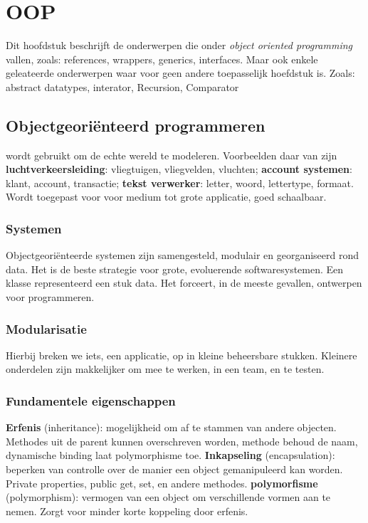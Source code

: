 \section{OOP}
Dit hoofdstuk beschrijft de onderwerpen die onder \textit{object oriented programming} vallen, zoals: references, wrappers, generics, interfaces.
Maar ook enkele geleateerde onderwerpen waar voor geen andere toepasselijk hoefdstuk is. Zoals: abstract datatypes, interator, Recursion, Comparator

\subsection{Objectgeoriënteerd programmeren}
 wordt gebruikt om de echte wereld te modeleren.
Voorbeelden daar van zijn \textbf{luchtverkeersleiding}: vliegtuigen, vliegvelden, vluchten; \textbf{account systemen}: klant, account, transactie; \textbf{tekst verwerker}: letter, woord, lettertype, formaat.
Wordt toegepast voor voor medium tot grote applicatie, goed schaalbaar.

\subsubsection{Systemen}
Objectgeoriënteerde systemen zijn samengesteld, modulair en georganiseerd rond data.
Het is de beste strategie voor grote, evoluerende softwaresystemen.
Een klasse representeerd een stuk data.
Het forceert, in de meeste gevallen, ontwerpen voor programmeren.

\subsubsection{Modularisatie}
Hierbij breken we iets, een applicatie, op in kleine beheersbare stukken.
Kleinere onderdelen zijn makkelijker om mee te werken, in een team, en te testen.

\subsubsection{Fundamentele eigenschappen}
\textbf{Erfenis} (inheritance): mogelijkheid om af te stammen van andere objecten.
Methodes uit de parent kunnen overschreven worden, methode behoud de naam, dynamische binding laat polymorphisme toe.
\textbf{Inkapseling} (encapsulation): beperken van controlle over de manier een object gemanipuleerd kan worden.
Private properties, public get, set, en andere methodes.
\textbf{polymorfisme} (polymorphism): vermogen van een object om verschillende vormen aan te nemen.
Zorgt voor minder korte koppeling door erfenis.


